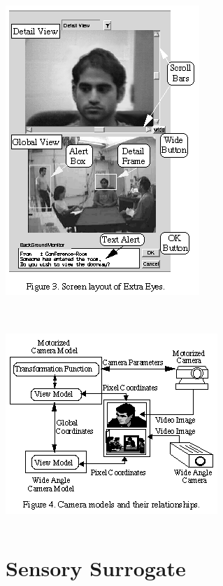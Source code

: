 \documentclass{beamer}
\begin{document}
\begin{frame}
\frametitle{}


\begin{columns}

\centerline{\includegraphics[width=0.500000\linewidth,keepaspectratio]{ky_fg3.png}}

\end{columns}

\end{frame}

\begin{frame}
\frametitle{}


\begin{columns}

\centerline{\includegraphics[width=0.500000\linewidth,keepaspectratio]{ky_fg4.png}}

\end{columns}

\end{frame}

\section[Sensory Surrogate]{Sensory Surrogate}
\end{document}
